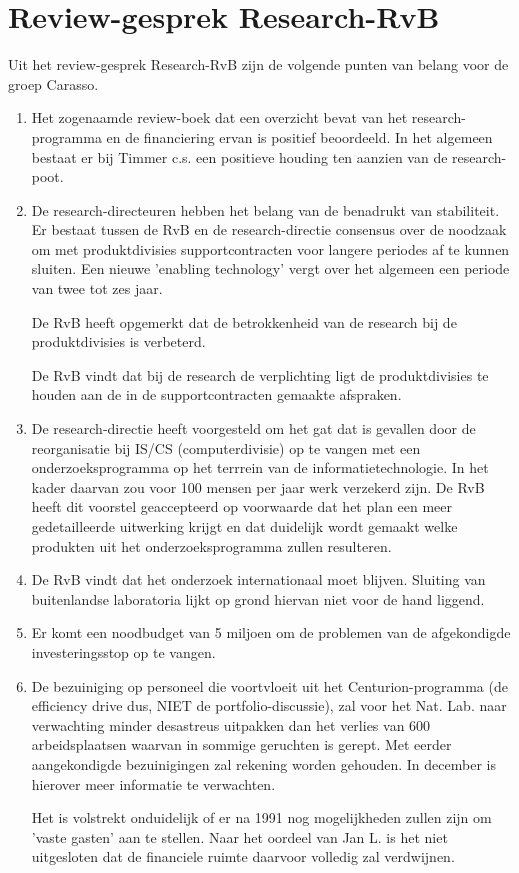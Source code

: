 \section{Review-gesprek Research-RvB}
Uit het review-gesprek Research-RvB zijn de volgende punten van belang voor
de groep 
Carasso.

\begin{enumerate}
  \item Het zogenaamde review-boek dat een overzicht bevat van het 
research-programma en de financiering ervan is positief beoordeeld.
In het algemeen bestaat er bij Timmer c.s. een positieve houding ten aanzien 
van de research-poot. 
  \item De research-directeuren hebben het belang van de benadrukt van 
stabiliteit.  Er bestaat tussen de RvB en de research-directie 
consensus over de noodzaak om met produktdivisies 
supportcontracten voor langere periodes
af te kunnen sluiten.  Een nieuwe 'enabling technology' vergt over 
het algemeen een periode van twee tot zes jaar.

De RvB heeft opgemerkt dat de
betrokkenheid van de research bij de produktdivisies is verbeterd.

De RvB vindt dat bij de research de verplichting 
ligt de produktdivisies te houden aan de in de supportcontracten 
gemaakte afspraken. 

\item De research-directie 
heeft voorgesteld om het gat dat is gevallen door de
reorganisatie bij IS/CS (computerdivisie) op te vangen met een 
onderzoeksprogramma op het terrrein van de informatietechnologie.
In het kader daarvan zou voor 100 mensen per jaar werk verzekerd zijn. 
De RvB heeft dit voorstel geaccepteerd op voorwaarde dat het plan 
een meer gedetailleerde uitwerking krijgt en dat duidelijk wordt gemaakt welke 
produkten uit het onderzoeksprogramma zullen resulteren. 

\item De RvB vindt dat het onderzoek internationaal moet blijven. Sluiting van 
buitenlandse laboratoria lijkt op grond hiervan niet voor de hand liggend. 
\item Er komt een noodbudget van 5 miljoen om de problemen van de afgekondigde
investeringsstop op te vangen. 

\item De bezuiniging op personeel die voortvloeit uit het 
Centurion-programma (de efficiency drive dus, NIET de portfolio-discussie), 
zal voor het Nat. Lab. naar verwachting 
minder desastreus uitpakken dan het verlies van 600 arbeidsplaatsen waarvan in 
sommige geruchten is gerept. Met eerder aangekondigde bezuinigingen 
zal rekening worden gehouden. In december is hierover meer informatie 
te verwachten. 


Het is volstrekt onduidelijk of er na 1991 nog mogelijkheden zullen zijn om 
'vaste gasten' aan te stellen. Naar het oordeel van Jan L. 
is het niet uitgesloten dat de financiele ruimte 
daarvoor volledig zal verdwijnen. 
\end{enumerate}

